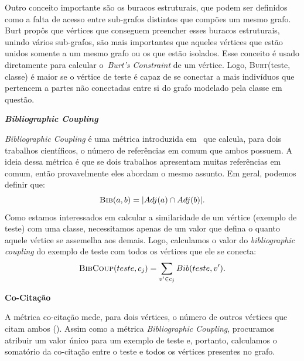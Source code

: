 \begin{description}
Outro conceito importante são os buracos estruturais, que podem ser definidos como a falta de acesso entre sub-grafos distintos que compões um mesmo grafo. Burt propôs que vértices que conseguem preencher esses buracos estruturais, unindo vários sub-grafos, são mais importantes que aqueles vértices que estão unidos somente a um mesmo grafo ou os que estão isolados. Esse conceito é usado diretamente para calcular o~\textit{Burt's Constraint} de um vértice. Logo, \textsc{Burt}(teste, classe) é maior se o vértice de teste é capaz de se conectar a mais indivíduos que pertencem a partes não conectadas entre si do grafo modelado pela classe em questão.

\item{\textbf{\textit{Bibliographic Coupling}}}
\label{item::bibcoup}

\textit{Bibliographic Coupling} é uma métrica introduzida em~\cite{Kessler63} que calcula, para dois trabalhos científicos, o número de referências em comum que ambos possuem. A ideia dessa métrica é que se dois trabalhos apresentam muitas referências em comum, então provavelmente eles abordam o mesmo assunto. Em geral, podemos definir que:
\begin{equation}
\textsc{Bib}(a, b) =  |Adj(a) \cap Adj(b)|.
\end{equation}
Como estamos interessados em calcular a similaridade de um vértice (exemplo de teste) com uma classe, necessitamos apenas de um valor que defina o quanto aquele vértice se assemelha aos demais. Logo, calculamos o valor do \textit{bibliographic coupling} do exemplo de teste com todos os vértices que ele se conecta:
\begin{equation}
\textsc{BibCoup}(teste, c_j) =  \sum\limits_{v' \in c_j} Bib(teste, v').
\end{equation}

\item{\textbf{Co-Citação}}
\label{item::cocitation}

A métrica co-citação mede, para dois vértices, o número de outros vértices que citam ambos (\cite{Small73}). Assim como a métrica \textit{Bibliographic Coupling}, procuramos atribuir um valor único para um exemplo de teste e, portanto, calculamos o somatório da co-citação entre o teste e todos os vértices presentes no grafo.


\end{description}
